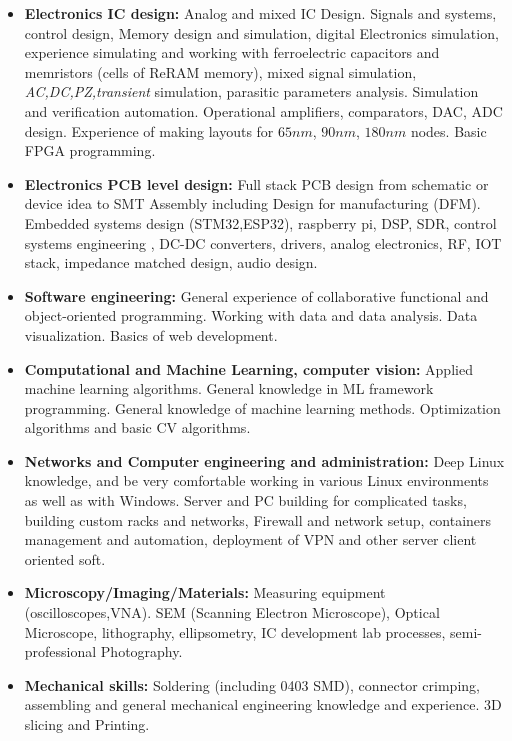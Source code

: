 \documentclass{article}
\begin{document}
\begin{itemize}

\item \textbf{Electronics IC design:} Analog and mixed IC Design. Signals and systems, control design, Memory design and simulation, digital Electronics simulation, experience simulating and working with ferroelectric capacitors and memristors (cells of ReRAM memory),   mixed signal simulation, \textit{AC,DC,PZ,transient} simulation, parasitic parameters analysis. Simulation and verification automation. Operational amplifiers, comparators, DAC, ADC design. Experience of making layouts for $65 nm$, $90nm$, $180nm$ nodes. Basic FPGA programming.
\item \textbf{Electronics PCB level design:} Full stack PCB design from schematic or device idea to SMT Assembly including Design for manufacturing (DFM). Embedded systems design (STM32,ESP32), raspberry pi, DSP, SDR,  control systems engineering , DC-DC converters, drivers, analog electronics, RF, IOT stack, impedance matched design, audio design.
\item \textbf{Software engineering:} General experience of collaborative functional and object-oriented programming. Working with data and data analysis. Data visualization. Basics of web development.
\item \textbf{Computational and Machine Learning, computer vision:} Applied machine learning algorithms. General knowledge in ML framework programming. General knowledge of machine learning methods. Optimization algorithms and basic CV algorithms.
\item \textbf{Networks and Computer engineering and administration:} Deep Linux knowledge, and be very comfortable working in various Linux environments as well as with Windows. Server and PC building for complicated tasks, building custom racks and networks, Firewall and network setup, containers management and automation, deployment of VPN and other server client oriented soft.
\item \textbf{Microscopy/Imaging/Materials:} Measuring equipment (oscilloscopes,VNA). SEM (Scanning Electron Microscope), Optical Microscope, lithography, ellipsometry, IC development lab processes, semi-professional Photography.
\item \textbf{Mechanical skills:} Soldering (including 0403 SMD), connector crimping,  assembling and general mechanical engineering knowledge and experience. 3D slicing and Printing.
\end{itemize}
 
\end{document}

